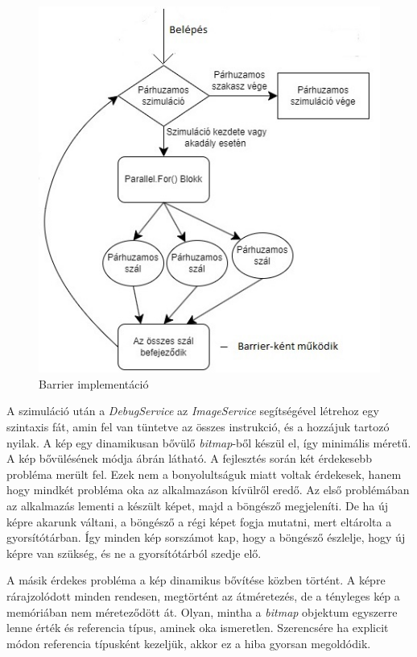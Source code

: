 \begin{figure}[h]
\centering
\includegraphics[scale=0.9]{images/Barrier.jpg}
\caption{Barrier implementáció}
\label{fig:Barrier}
\end{figure}

A szimuláció után a \textit{DebugService} az \textit{ImageService} segítségével létrehoz egy szintaxis fát, amin fel van tüntetve az összes instrukció, és a hozzájuk tartozó nyilak. A kép egy dinamikusan bővülő \textit{bitmap}-ből készül el, így minimális méretű. A kép bővülésének módja  ábrán látható. A fejlesztés során két érdekesebb probléma merült fel. Ezek nem a bonyolultságuk miatt voltak érdekesek, hanem hogy mindkét probléma oka az alkalmazáson kívülről eredő. Az első problémában az alkalmazás lementi a készült képet, majd a böngésző megjeleníti. De ha új képre akarunk váltani, a böngésző a régi képet fogja mutatni, mert eltárolta a gyorsítótárban. Így minden kép sorszámot kap, hogy a böngésző észlelje, hogy új képre van szükség, és ne a gyorsítótárból szedje elő. 

A másik érdekes probléma a kép dinamikus bővítése közben történt. A képre rárajzolódott minden rendesen, megtörtént az átméretezés, de a tényleges kép a memóriában nem méreteződött át. Olyan, mintha a \textit{bitmap} objektum egyszerre lenne érték és referencia típus, aminek oka ismeretlen. Szerencsére ha explicit módon referencia típusként kezeljük, akkor ez a hiba gyorsan megoldódik.

